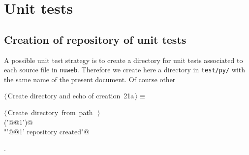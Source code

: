 \documentclass[11pt,oneside]{article}	%
\begin{document}
\section{Unit tests}
\label{sec:tests}

\subsection{Creation of repository of unit tests}

A possible unit test strategy is to create a directory for unit tests associated to each source file in \texttt{nuweb}. Therefore we create here a directory in \texttt{test/py/} with the same name of the present document. Of course other 

\begin{flushleft} \small
\begin{minipage}{\linewidth} \label{scrap34}
\protect{}$\langle\,$Create directory and echo of creation\nobreak\ {\footnotesize 21a}$\,\rangle\equiv$
\vspace{-1ex}
\begin{list}{}{} \item
\mbox{}\verb@@\hbox{$\langle\,$Create directory from path\nobreak\ {\footnotesize {}}$\,\rangle$}\verb@@\\
\mbox{}\verb@createDir('@@1\verb@')@\\
\mbox{}\verb@print "'@@1\verb@' repository created"@\\
\mbox{}\verb@@{\NWsep}
\end{list}
\vspace{-1ex}
\footnotesize\addtolength{\baselineskip}{-1ex}
\begin{list}{}{\setlength{\itemsep}{-\parsep}\setlength{\itemindent}{-\leftmargin}}
\item {\NWtxtMacroNoRef}.
\end{list}
\end{minipage}\\[4ex]
\end{flushleft}
\end{document}
